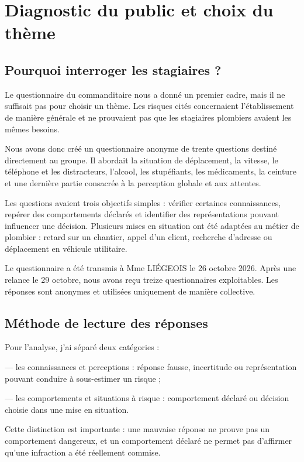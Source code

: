 \chapter{Diagnostic du public et choix du thème}
\section{Pourquoi interroger les stagiaires ?}

Le questionnaire du commanditaire nous a donné un premier cadre, mais il ne suffisait pas pour choisir un thème. Les risques cités concernaient l’établissement de manière générale et ne prouvaient pas que les stagiaires plombiers avaient les mêmes besoins.

Nous avons donc créé un questionnaire anonyme de trente questions destiné directement au groupe. Il abordait la situation de déplacement, la vitesse, le téléphone et les distracteurs, l’alcool, les stupéfiants, les médicaments, la ceinture et une dernière partie consacrée à la perception globale et aux attentes.

Les questions avaient trois objectifs simples : vérifier certaines connaissances, repérer des comportements déclarés et identifier des représentations pouvant influencer une décision. Plusieurs mises en situation ont été adaptées au métier de plombier : retard sur un chantier, appel d’un client, recherche d’adresse ou déplacement en véhicule utilitaire.

Le questionnaire a été transmis à Mme LIÉGEOIS le 26 octobre 2026. Après une relance le 29 octobre, nous avons reçu treize questionnaires exploitables. Les réponses sont anonymes et utilisées uniquement de manière collective.

\section{Méthode de lecture des réponses}

Pour l’analyse, j’ai séparé deux catégories :

— les connaissances et perceptions : réponse fausse, incertitude ou représentation pouvant conduire à sous-estimer un risque ;

— les comportements et situations à risque : comportement déclaré ou décision choisie dans une mise en situation.

Cette distinction est importante : une mauvaise réponse ne prouve pas un comportement dangereux, et un comportement déclaré ne permet pas d’affirmer qu’une infraction a été réellement commise.

